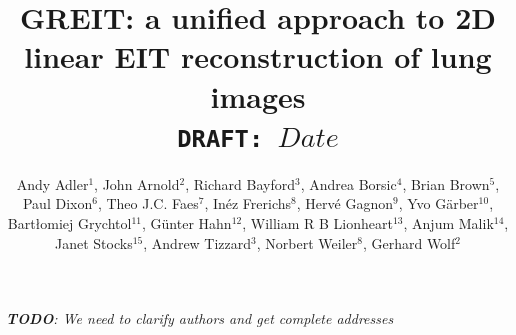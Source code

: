 \documentclass[12pt]{iopart}
\begin{document}
\title[GREIT: linear EIT image reconstruction]{%
GREIT: a unified approach to 2D linear EIT reconstruction of
       lung images
\\
{\small \tt DRAFT: $Date$}
}

\author{Andy Adler$^{1}$,
        John Arnold$^{2}$,
        Richard Bayford$^{3}$,
        Andrea Borsic$^{4}$,
        Brian Brown$^{5}$,
        Paul Dixon$^{6}$,
        Theo J.C. Faes$^{7}$,
        In\'ez Frerichs$^{8}$,
        Herv\'e Gagnon$^{9}$,
        Yvo G\"arber$^{10}$,
        Bart\l{}omiej Grychtol$^{11}$, 
        G\"unter Hahn$^{12}$,
        William R B Lionheart$^{13}$,
        Anjum Malik$^{14}$,
        Janet Stocks$^{15}$,
        Andrew Tizzard$^{3}$,
        Norbert Weiler$^{8}$,
        Gerhard Wolf$^{2}$%
       }

{\em {\bf TODO}: We need to clarify authors and get complete addresses}
\address{ $^{1}$Systems and Computer Engineering,
                Carleton University, Ottawa, Canada}
\address{ $^{2}$Division of Critical Care Medicine, Department of Anesthesia,
                Children's Hospital Boston, Harvard Medical School, Boston, MA, USA}
\address{ $^{3}$Middlesex University, London, UK}
\address{ $^{4}$School of Engineering, 
                Dartmouth College, Hanover, NH, USA}
\address{ $^{5}$University of Sheffield, UK}
\address{ $^{6}$Cardinal Health Care, London, UK}
\address{ $^{7}$V.U. university medical center, Amsterdam, Netherlands}
\address{ $^{8}$University of Kiel, Germany}
\address{ $^{9}$D\'epartement de g\'enie \'electrique,
                \'Ecole Polytechnique de Montr\'eal, Canada}
\address{$^{10}$Dr\"ager Medical, L\"ubeck, Germany}
\address{$^{11}$University of Strathclyde, Glasgow, UK}
\address{$^{12}$University of G\"ottingen, Germany}
\address{$^{13}$University of Manchester, UK}
\address{$^{14}$Maltron International, Rayleigh, UK}
\address{$^{15}$Institute of Child Health, UCL, London, UK}
\end{document}
